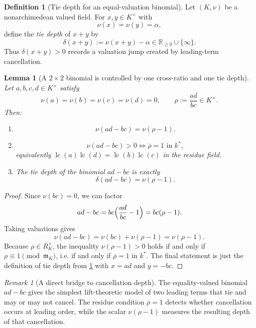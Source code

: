 \documentclass[11pt]{amsart}
\numberwithin{equation}{section}
\theoremstyle{plain}
\newtheorem{lemma}[theorem]{Lemma}
\theoremstyle{definition}
\newtheorem{definition}[theorem]{Definition}
\theoremstyle{remark}
\newtheorem{remark}[theorem]{Remark}
\newcommand{\RR}{\mathbb{R}}
\begin{document}
\begin{definition}[Tie depth for an equal-valuation binomial]
\label{def:tie-depth-binomial}
Let $(K,\nu)$ be a nonarchimedean valued field. For $x,y\in K^\times$ with
\[
\nu(x)=\nu(y)=\alpha,
\]
define the \emph{tie depth} of $x+y$ by
\[
\delta(x+y):=\nu(x+y)-\alpha\in \RR_{\ge 0}\cup\{\infty\}.
\]
Thus $\delta(x+y)>0$ records a valuation jump created by leading-term cancellation.
\end{definition}

\begin{lemma}[A $2\times2$ binomial is controlled by one cross-ratio and one tie depth]
\label{lem:2x2-crossratio-tiedepth}
Let $a,b,c,d\in K^\times$ satisfy
\[
\nu(a)=\nu(b)=\nu(c)=\nu(d)=0,
\qquad
\rho:=\frac{ad}{bc}\in K^\times.
\]
Then:
\begin{enumerate}[leftmargin=2em]
  \item \[\nu(ad-bc)=\nu(\rho-1).\]
  \item \[\nu(ad-bc)>0 \iff \overline\rho=1\text{ in }k^*,\]
  equivalently $\operatorname{lc}(a)\operatorname{lc}(d)=\operatorname{lc}(b)\operatorname{lc}(c)$ in the residue field.
  \item The tie depth of the binomial $ad-bc$ is exactly
  \[\delta(ad-bc)=\nu(\rho-1).\]
\end{enumerate}
\end{lemma}

\begin{proof}
Since $\nu(bc)=0$, we can factor
\[
ad-bc=bc\Bigl(\frac{ad}{bc}-1\Bigr)=bc(\rho-1).
\]
Taking valuations gives
\[
\nu(ad-bc)=\nu(bc)+\nu(\rho-1)=\nu(\rho-1).
\]
Because $\rho\in R_K^\times$, the inequality $\nu(\rho-1)>0$ holds if and only if $\rho\equiv 1\pmod{\mathfrak m_K}$, i.e. if and only if $\overline\rho=1$ in $k^*$. The final statement is just the definition of tie depth from \cref{def:tie-depth-binomial} with $x=ad$ and $y=-bc$.
\end{proof}

\begin{remark}[A direct bridge to cancellation depth]
\label{rem:note31-cancellation-bridge}
The equality-valued binomial $ad-bc$ gives the simplest lift-theoretic model of two leading terms that tie and may or may not cancel. The residue condition $\overline\rho=1$ detects whether cancellation occurs at leading order, while the scalar $\nu(\rho-1)$ measures the resulting depth of that cancellation.
\end{remark}

\end{document}
